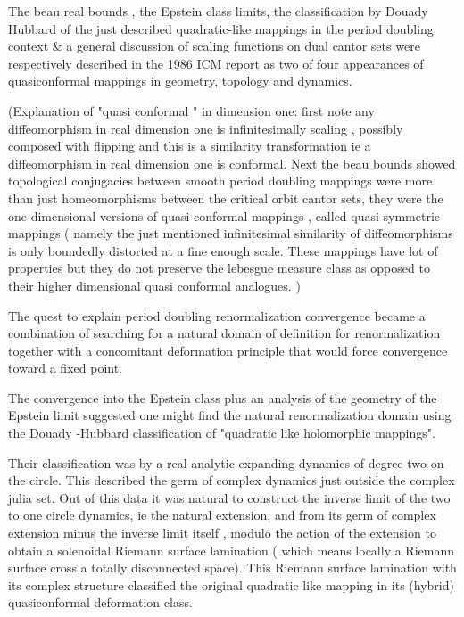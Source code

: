 \begin{description}
The  beau real  bounds , the Epstein class limits, the classification by
Douady Hubbard of the just described quadratic-like mappings in the
period doubling context  \&  a general discussion of scaling functions on
dual cantor sets were respectively described in  the 1986 ICM  report  as
two  of four appearances of  quasiconformal mappings  in geometry,
topology and dynamics.

 (Explanation  of "quasi conformal " in dimension one: first note any diffeomorphism in real dimension one is infinitesimally  scaling , possibly composed with flipping   and this is a similarity transformation  ie a diffeomorphism in real dimension one is conformal.  Next  the beau bounds showed  topological conjugacies between smooth  period doubling mappings were more than just homeomorphisms between the critical orbit  cantor sets, they were the one dimensional versions of quasi conformal mappings , called quasi symmetric mappings ( namely the just mentioned  infinitesimal similarity of diffeomorphisms  is only boundedly distorted at a fine enough scale. These mappings have lot of properties  but  they do not  preserve the lebesgue measure class  as opposed to  their higher dimensional  quasi conformal analogues. )

The quest to explain  period doubling renormalization convergence became a combination of searching for  a  natural domain of  definition for renormalization  together with a concomitant deformation principle that would  force  convergence toward  a fixed point.

The convergence into the Epstein class  plus  an analysis of the geometry of the Epstein limit suggested one  might find the natural renormalization domain using the Douady -Hubbard classification of  "quadratic like  holomorphic mappings".

Their classification was  by a  real analytic expanding dynamics of degree two  on the circle.  This described the germ of complex dynamics just outside the complex julia set.
Out of this data  it was  natural to construct  the  inverse limit of the two to one  circle dynamics, ie the natural extension, and from its germ of complex extension minus  the inverse limit itself , modulo the  action of the extension to obtain a solenoidal Riemann surface lamination ( which means locally a Riemann surface cross a totally disconnected space). This Riemann surface lamination with its complex structure classified the original quadratic like mapping in its (hybrid) quasiconformal deformation class.


\end{description}

